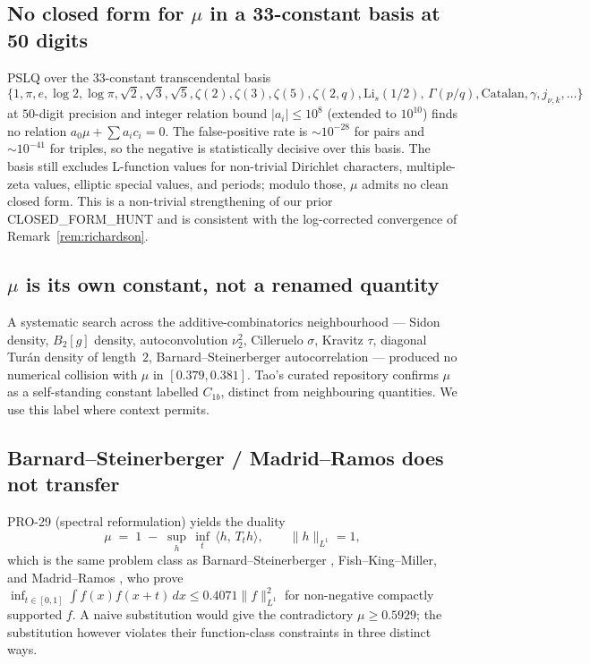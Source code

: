\documentclass[11pt]{article}
\theoremstyle{plain}
\theoremstyle{definition}
\begin{document}
\subsection{No closed form for $\mu$ in a 33-constant basis at 50 digits}

PSLQ over the 33-constant transcendental basis
\[
\{1, \pi, e, \log 2, \log \pi, \sqrt 2, \sqrt 3, \sqrt 5, \zeta(2),
\zeta(3), \zeta(5), \zeta(2, q), \mathrm{Li}_s(1/2),\,
\Gamma(p/q), \mathrm{Catalan}, \gamma, j_{\nu, k}, \ldots\}
\]
at $50$-digit precision and integer relation bound $|a_i| \le 10^8$
(extended to $10^{10}$) finds no relation
$a_0 \mu + \sum a_i c_i = 0$. The false-positive rate is
$\sim 10^{-28}$ for pairs and $\sim 10^{-41}$ for triples, so the
negative is statistically decisive over this basis. The basis still
excludes L-function values for non-trivial Dirichlet characters,
multiple-zeta values, elliptic special values, and periods; modulo
those, $\mu$ admits no clean closed form. This is a non-trivial
strengthening of our prior CLOSED\_FORM\_HUNT and is consistent with
the log-corrected convergence of Remark~\ref{rem:richardson}.

\subsection{$\mu$ is its own constant, not a renamed quantity}

A systematic search across the additive-combinatorics neighbourhood —
Sidon density, $B_2[g]$ density, autoconvolution $\nu_2^2$, Cilleruelo
$\sigma$, Kravitz $\tau$, diagonal Tur\'an density of length~$2$,
Barnard--Steinerberger autocorrelation — produced no numerical
collision with $\mu$ in $[0.379, 0.381]$. Tao's curated repository
\cite{TaoOptProb} confirms $\mu$ as a self-standing constant labelled
$C_{1b}$, distinct from neighbouring quantities. We use this label
where context permits.

\subsection{Barnard--Steinerberger / Madrid--Ramos does not transfer}

PRO-29 (spectral reformulation) yields the duality
\[
\mu \;=\; 1 \;-\; \sup_h\,\inf_t\, \langle h,\, T_t h\rangle,
\qquad \|h\|_{L^1} = 1,
\]
which is the same problem class as Barnard--Steinerberger
\cite{BarnardSteinerberger2019}, Fish--King--Miller, and Madrid--Ramos
\cite{MadridRamos2020}, who prove
$\inf_{t \in [0,1]} \int f(x) f(x+t)\, dx \le 0.4071 \|f\|_{L^1}^2$ for
non-negative compactly supported $f$. A naive substitution would give
the contradictory $\mu \ge 0.5929$; the substitution however violates
their function-class constraints in three distinct ways.
\end{document}
